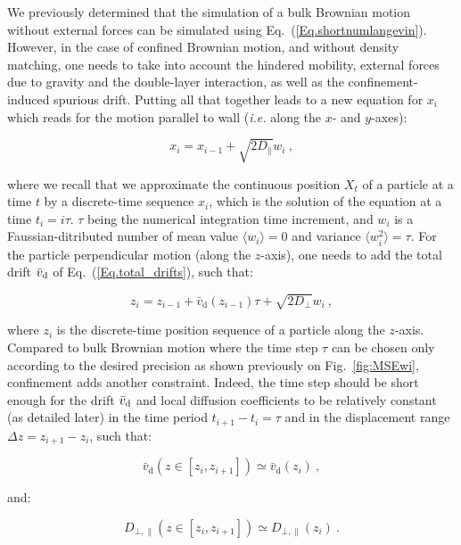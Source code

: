 We previously determined that the simulation of a bulk Brownian motion without external forces can be simulated using Eq.~(\ref{Eq.shortnumlangevin}).
However, in the case of confined Brownian motion, and without density matching, one needs to take into account the hindered mobility, external forces due to gravity and the double-layer interaction, as well as the confinement-induced spurious drift. Putting all that together leads to a new equation for $x_i$ which reads for the motion parallel to wall (\textit{i.e.} along the $x$- and $y$-axes):

\begin{equation}
	x_i = x_{i-1} +  \sqrt{2D_\parallel}w_i ~,
	\label{eq.langevinnearx}
\end{equation}

where we recall that we approximate the continuous position $X_t$ of a particle at a time $t$ by a discrete-time sequence $x_i$, which is the solution of the equation at a time $t_i = i\tau$. $\tau$ being the numerical integration time increment, and $w_i$ is a Faussian-ditributed number of mean value $\langle w_i \rangle =0$ and variance $\langle w_i ^2\rangle = \tau$. For the particle perpendicular motion (along the $z$-axis), one needs to add the total drift $\bar{v}_\textnormal{d}$ of Eq.~(\ref{Eq.total_drifts}), such that:

\begin{equation}
	z_i = z_{i-1} + \bar{v}_\mathrm{d}(z_{i-1}) \tau + \sqrt{2D_\bot}w_i ~,
	\label{eq.langevinnearz}
\end{equation}

 where $z_i$ is the discrete-time position sequence of a particle along the $z$-axis. Compared to bulk Brownian motion where the time step $\tau$ can be chosen only according to the desired precision as shown previously on Fig.~\ref{fig:MSEwi}, confinement adds another constraint. Indeed, the time step should be short enough for the drift $\bar{v}_\textnormal{d}$ and local diffusion coefficients to be relatively constant (as detailed later) in the time period $t_{i+1} - t_i = \tau$ and in the displacement range $\Delta z = z_{i+1} - z_i$, such that:

\begin{equation}
	\bar{v}_\mathrm{d} (z \in [z_i, z_{i+1}]) \simeq \bar{v}_\mathrm{d} (z_i) ~,
	\label{driftc}
\end{equation}

and:

\begin{equation}
	D_{\bot, \parallel}(z \in [z_i, z_{i+1}]) \simeq D_{\bot, \parallel}(z_i) ~.
\end{equation}

